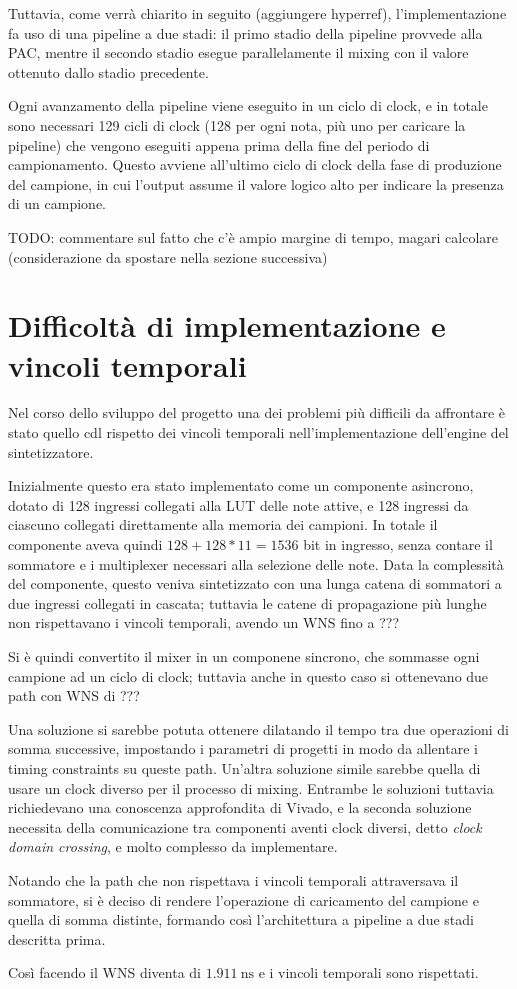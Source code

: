 Tuttavia, come verrà chiarito in seguito (aggiungere hyperref),
l'implementazione fa uso di una pipeline a due stadi:
il primo stadio della pipeline provvede alla PAC, mentre il secondo stadio
esegue parallelamente il mixing con il valore ottenuto dallo stadio
precedente.

Ogni avanzamento della pipeline viene eseguito in un ciclo di clock,
e in totale sono necessari 129 cicli di clock
(128 per ogni nota, più uno per caricare la pipeline) che vengono eseguiti
appena prima della fine del periodo di campionamento.
Questo avviene all'ultimo ciclo di clock della fase di produzione del
campione, in cui l'output  assume il valore
logico alto per indicare la presenza di un campione.

TODO: commentare sul fatto che c'è ampio margine di tempo, magari calcolare
      (considerazione da spostare nella sezione successiva)

\section{Difficoltà di implementazione e vincoli temporali}
Nel corso dello sviluppo del progetto una dei problemi più difficili da affrontare
è stato quello cdl rispetto dei vincoli temporali nell'implementazione dell'engine
del sintetizzatore.

Inizialmente questo era stato implementato come un componente asincrono, dotato di 
128 ingressi collegati alla LUT delle note attive, e 128 ingressi da 
ciascuno collegati direttamente alla memoria dei campioni.
In totale il componente aveva quindi $128+128*11 = 1536$ bit in ingresso, senza contare
il sommatore e i multiplexer necessari alla selezione delle note.
Data la complessità del componente, questo veniva sintetizzato con una lunga catena
di sommatori a due ingressi collegati in cascata; tuttavia le catene di propagazione più lunghe
non rispettavano i vincoli temporali, avendo un WNS fino a ???

Si è quindi convertito il mixer in un componene sincrono, che sommasse ogni campione
ad un ciclo di clock; tuttavia anche in questo caso si ottenevano due path con WNS di ???

Una soluzione si sarebbe potuta ottenere dilatando il tempo tra due operazioni di somma
successive, impostando i parametri di progetti in modo da allentare i timing constraints
su queste path.
Un'altra soluzione simile sarebbe quella di usare un clock diverso per il processo di mixing.
Entrambe le soluzioni tuttavia richiedevano una conoscenza approfondita di Vivado,
e la seconda soluzione necessita della comunicazione tra componenti aventi 
clock diversi, detto \textit{clock domain crossing}, e molto complesso da
implementare.

Notando che la path che non rispettava i vincoli temporali attraversava
il sommatore, si è deciso di rendere l'operazione di caricamento del campione
e quella di somma distinte, formando così l'architettura a pipeline a due stadi descritta prima.

Così facendo il WNS diventa di $\SI{1.911}{\nano \second}$ e i vincoli temporali sono rispettati.

